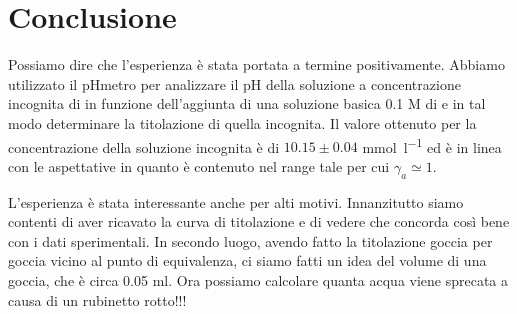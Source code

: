 \section*{Conclusione}

Possiamo dire che l'esperienza è stata portata a termine positivamente.
Abbiamo utilizzato il pHmetro per analizzare il pH della soluzione a concentrazione incognita di  in funzione dell'aggiunta di una soluzione basica 0.1 M di  e in tal modo determinare la titolazione di quella incognita.
Il valore ottenuto per la concentrazione della soluzione incognita è di $10.15 \pm 0.04$ \si{\milli\mol\per\litre} ed è in linea con le aspettative in quanto è contenuto nel range tale per cui $\gamma_{a} \simeq 1$.

L'esperienza è stata interessante anche per alti motivi. Innanzitutto siamo contenti di aver ricavato la curva
di titolazione e di vedere che concorda così bene con i dati sperimentali. In secondo luogo, avendo fatto la titolazione
goccia per goccia vicino al punto di equivalenza, ci siamo fatti un idea del volume di una goccia, che è
circa 0.05 ml. Ora possiamo calcolare quanta acqua viene sprecata a causa di un rubinetto rotto!!!

